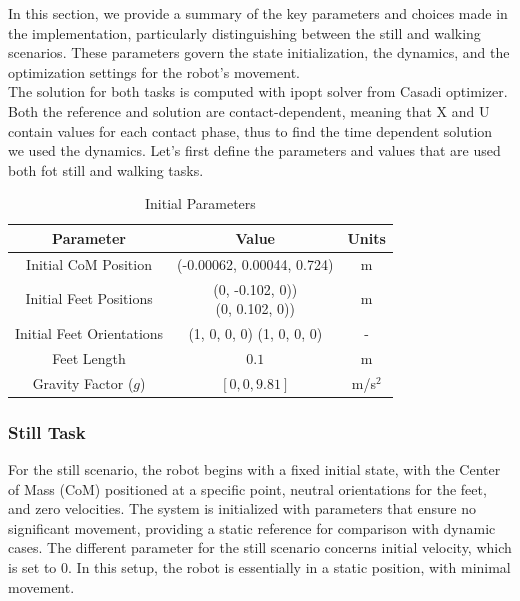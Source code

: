 \documentclass[main.tex]{subfiles}
\begin{document}
In this section, we provide a summary of the key parameters and choices made in the implementation, particularly distinguishing between the still and walking scenarios. These parameters govern the state initialization, the dynamics, and the optimization settings for the robot's movement.
\\The solution for both tasks is computed with ipopt solver from Casadi optimizer. Both the reference and solution are contact-dependent, meaning that X and U contain values for each contact phase, thus to find the time dependent solution we used the dynamics. 
Let's first define the parameters and values that are used both fot still and walking tasks.
\begin{table}[H]
\centering
\renewcommand{\arraystretch}{1.5} %
\begin{tabular}{|c|c|c|}
\hline
\textbf{Parameter} & \textbf{Value} & \textbf{Units} \\ \hline
Initial CoM Position & (-0.00062, 0.00044, 0.724) & m \\ \hline
Initial Feet Positions & 
\parbox[c]{10cm}{
\centering
(0, -0.102, 0))\\
(0, 0.102, 0))
} & m \\ \hline
Initial Feet Orientations & 
(1, 0, 0, 0)
(1, 0, 0, 0) & - \\ \hline
Feet Length & \(0.1\) & m \\ \hline
Gravity Factor (\(g\)) & \([0, 0, 9.81]\) & m/s\(^2\) \\ \hline
\end{tabular}
\caption{Initial Parameters}
\label{tab:parameters}
\end{table}


\subsubsection*{Still Task}

For the still scenario, the robot begins with a fixed initial state, with the Center of Mass (CoM) positioned at a specific point, neutral orientations for the feet, and zero velocities. The system is initialized with parameters that ensure no significant movement, providing a static reference for comparison with dynamic cases. 
The different parameter for the still scenario concerns initial velocity, which is set to 0.
In this setup, the robot is essentially in a static position, with minimal movement. 
\end{document}
